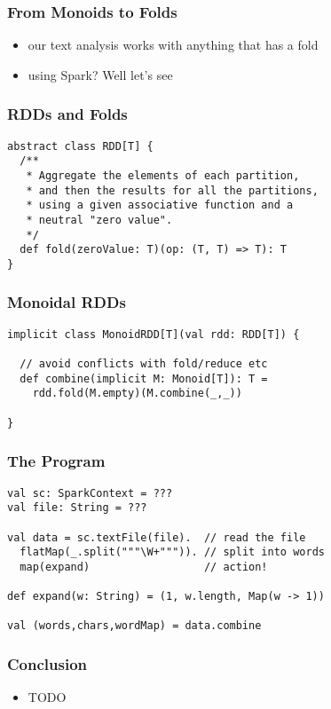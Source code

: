 \documentclass[aspectratio=169]{beamer}
\begin{document}
\begin{frame}
  \frametitle{From Monoids to Folds}
  \begin{itemize}
  \item our text analysis works with anything that has a fold
  \item using Spark? Well let's see
  \end{itemize}
\end{frame}

\begin{frame}[fragile]
  \frametitle{RDDs and Folds}
\begin{verbatim}
abstract class RDD[T] {
  /**
   * Aggregate the elements of each partition,
   * and then the results for all the partitions,
   * using a given associative function and a
   * neutral "zero value".
   */
  def fold(zeroValue: T)(op: (T, T) => T): T
}
\end{verbatim}
\end{frame}

\begin{frame}[fragile]
  \frametitle{Monoidal RDDs}
\begin{verbatim}
implicit class MonoidRDD[T](val rdd: RDD[T]) {

  // avoid conflicts with fold/reduce etc
  def combine(implicit M: Monoid[T]): T =
    rdd.fold(M.empty)(M.combine(_,_))

}
\end{verbatim}
\end{frame}

\begin{frame}
  \frametitle{The Program}
\begin{verbatim}
val sc: SparkContext = ???
val file: String = ???

val data = sc.textFile(file).  // read the file
  flatMap(_.split("""\W+""")). // split into words
  map(expand)                  // action!

def expand(w: String) = (1, w.length, Map(w -> 1))

val (words,chars,wordMap) = data.combine
\end{verbatim}
\end{frame}

\begin{frame}
  \frametitle{Conclusion}
  \begin{itemize}
  \item TODO
  \end{itemize}
\end{frame}
\end{document}
